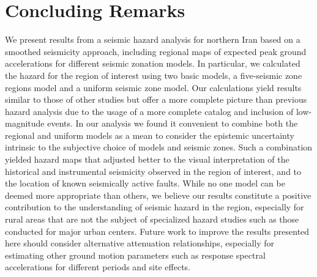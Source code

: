 
\section{Concluding Remarks}

We present results from a seismic hazard analysis for northern Iran based on a smoothed seismicity approach, including regional maps of expected peak ground accelerations for different seismic zonation models. In particular, we calculated the hazard for the region of interest using two basic models, a five-seismic zone regions model and a uniform seismic zone model. Our calculations yield results similar to those of other studies but offer a more complete picture than previous hazard analysis due to the usage of a more complete catalog and inclusion of low-magnitude events. In our analysis we found it convenient to combine both the regional and uniform models as a mean to consider the epistemic uncertainty intrinsic to the subjective choice of models and seismic zones. Such a combination yielded hazard maps that adjusted better to the visual interpretation of the historical and instrumental seismicity observed in the region of interest, and to the location of known seismically active faults. While no one model can be deemed more appropriate than others, we believe our results constitute a positive contribution to the understanding of seismic hazard in the region, especially for rural areas that are not the subject of specialized hazard studies such as those conducted for major urban centers. Future work to improve the results presented here should consider alternative attenuation relationships, especially for estimating other ground motion parameters such as response spectral accelerations for different periods and site effects.

